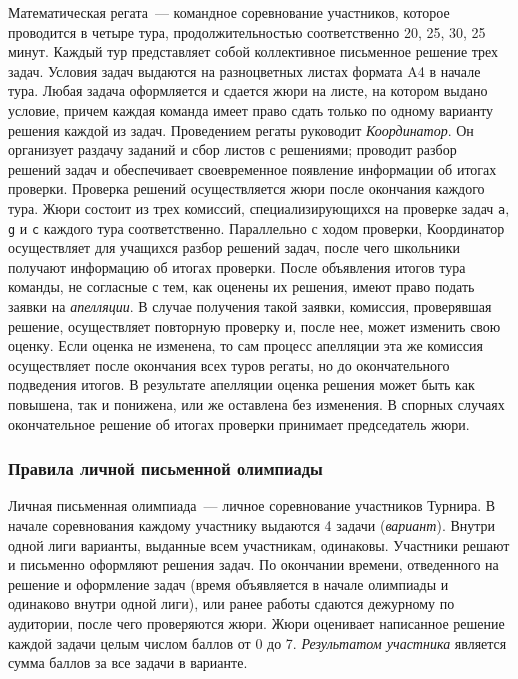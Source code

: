 Математическая регата~---
командное соревнование участников, которое проводится в четыре тура,
продолжительностью соответственно 20, 25, 30, 25 минут.
Каждый тур представляет собой коллективное письменное решение трех задач.
Условия задач выдаются на разноцветных листах формата A4 в начале тура.
Любая задача оформляется и сдается жюри на листе, на котором выдано условие,
причем каждая команда имеет право сдать только по одному варианту решения
каждой из задач.
Проведением регаты руководит \emph{Координатор}.
Он организует раздачу заданий и сбор листов с решениями; проводит разбор
решений задач и обеспечивает своевременное появление информации об итогах
проверки.
Проверка решений осуществляется жюри после окончания каждого тура.
Жюри состоит из трех комиссий, специализирующихся на проверке задач
\texttt{a}, \texttt{g} и \texttt{c} каждого тура соответственно.
Параллельно с ходом проверки, Координатор осуществляет для учащихся разбор
решений задач, после чего школьники получают информацию об итогах проверки.
После объявления итогов тура команды, не согласные с тем, как оценены их
решения, имеют право подать заявки на \emph{апелляции}.
В случае получения такой заявки, комиссия, проверявшая решение, осуществляет
повторную проверку и, после нее, может изменить свою оценку.
Если оценка не изменена, то сам процесс апелляции эта же комиссия осуществляет
после окончания всех туров регаты, но до окончательного подведения итогов.
В результате апелляции оценка решения может быть как повышена, так и понижена,
или же оставлена без изменения.
В спорных случаях окончательное решение об итогах проверки принимает
председатель жюри.

\subsubsection*{Правила личной письменной олимпиады}

Личная письменная олимпиада~---
личное соревнование участников Турнира.
В начале соревнования каждому участнику выдаются 4 задачи (\emph{вариант}).
Внутри одной лиги варианты, выданные всем участникам, одинаковы.
Участники решают и письменно оформляют решения задач.
По окончании времени, отведенного на решение и оформление задач (время
объявляется в начале олимпиады и одинаково внутри одной лиги), или ранее
работы сдаются дежурному по аудитории, после чего проверяются жюри.
Жюри оценивает написанное решение каждой задачи целым числом баллов от 0 до 7.
\emph{Результатом участника}
является сумма баллов за все задачи в варианте.

